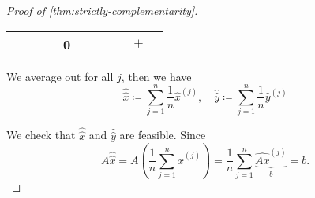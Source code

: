 \begin{proof}[Proof of \autoref{thm:strictly-complementarity}]
\begin{table}[H]
\begin{tabular}{c|ccccc|ccccc}
			           &                                           &                                                    &                   & 0            &            &                                                        &            &                                                                                  & \(+\)      &            \\
			\bottomrule
		\end{tabular}
	\end{table}
	\begin{intuition}
		We average out for all \(j\), then we have
		\[
			\hat{\hat{x}} \coloneqq \sum\limits_{j=1}^{n} \frac{1}{n}\hat{x}^{(j)},\quad \hat{\hat{y}} \coloneqq \sum\limits_{j=1}^{n} \frac{1}{n}\hat{y}^{(j)}
		\]
	\end{intuition}

	We check that \(\hat{\hat{x}}\) and \(\hat{\hat{y}}\) are \hyperref[def:feasible-solution]{feasible}. Since
	\[
		A\hat{\hat{x}} = A\left( \frac{1}{n}\sum\limits_{j=1}^{n} \hat{x}^{(j)} \right) = \frac{1}{n}\sum\limits_{j=1}^{n} \underbrace{\hat{Ax}^{(j)}}_{b} = b.
	\]
\end{proof}


